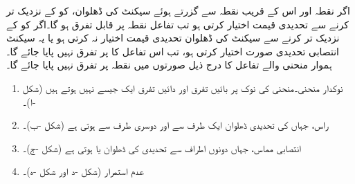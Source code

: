 اگر نقطہ  اور اس کے قریب نقطہ  سے گزرتے ہوئے سیکنٹ کی ڈھلوان،  کو  کے نزدیک تر کرنے سے تحدیدی قیمت اختیار کرتی ہو  تب تفاعل  نقطہ  پر قابل تفرق ہو گا۔اگر  کو  کے نزدیک تر کرنے سے سیکنٹ کی ڈھلوان  تحدیدی قیمت اختیار نہ کرتی ہو یا یہ سیکنٹ انتصابی تحدیدی صورت اختیار کرتی ہو، تب اس تفاعل کا  پر تفرق نہیں پایا جائے گا۔ہموار منحنی والے تفاعل کا درج ذیل صورتوں میں نقطہ  پر تفرق نہیں پایا جائے گا۔
\begin{enumerate}[1.]

\item
نوکدار منحنی۔منحنی کی نوک  پر بائیں تفرق اور دائیں تفرق ایک جیسے نہیں ہوتے ہیں (شکل -ا)۔
\item
راس، جہاں  کی تحدیدی ڈھلوان ایک طرف سے  اور دوسری طرف سے  ہوتی ہے (شکل -ب)۔ 
\item
انتصابی مماس، جہاں دونوں اطراف سے تحدیدی  کی ڈھلوان  یا  ہوتی ہے (شکل -ج)۔
\item
عدم استمرار (شکل -د اور شکل -ہ)۔
\end{enumerate}

